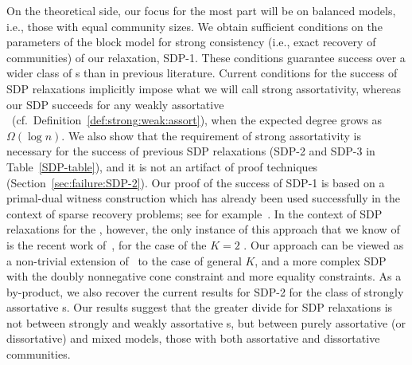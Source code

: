 On the theoretical side, our focus for the most part will be on balanced models, i.e., those with equal community sizes. We obtain sufficient conditions on the parameters of the block model for strong consistency (i.e., exact recovery of communities) of our relaxation, SDP-1. These conditions guarantee success over a wider class of \SBM s than in previous literature. Current conditions for the success of SDP relaxations implicitly impose what we will call strong assortativity, whereas our SDP succeeds for any 
weakly assortative \SBM~(cf.\ Definition~\ref{def:strong:weak:assort}), when the expected degree grows as $\Omega(\log n)$. We also show that the requirement of strong assortativity is necessary for the success of previous SDP relaxations (SDP-2 and SDP-3 in Table~\ref{SDP-table}), and it is not an artifact of proof techniques (Section~\ref{sec:failure:SDP-2}). Our proof of the success of SDP-1 is based on a primal-dual witness construction
which has already been used successfully in the context of sparse recovery problems; see for example~\cite{Wainwright2009,Amini2009}. In the context of SDP relaxations for the \SBM, however, the only instance of this approach that we know of is the recent work of~\cite{Abbe2014}, for the case of the $K=2$ \SBM. Our approach can be viewed as a non-trivial extension of~\cite{Abbe2014}  to the case of general $K$, and a more complex SDP with the doubly nonnegative cone constraint and more equality constraints. As a by-product, we also recover the current results for SDP-2 for the class of strongly assortative \SBM s. Our results suggest that the greater divide for SDP relaxations is not between strongly and weakly assortative \SBM s, but between purely assortative (or dissortative) and mixed models, those with both assortative and dissortative communities. 

